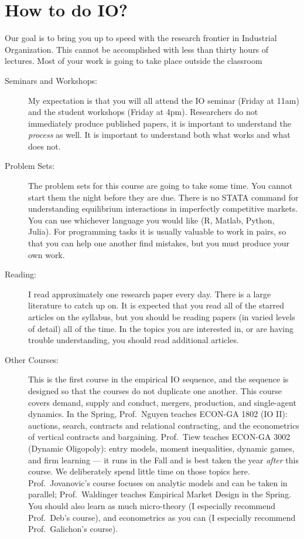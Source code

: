 \documentclass[11pt]{article}
\begin{document}
\section*{How to do IO?}
Our goal is to bring you up to speed with the research frontier in Industrial Organization. This cannot be accomplished with less than thirty hours of lectures. Most of your work is going to take place outside the classroom
\begin{description}
\item[Seminars and Workshops:] My expectation is that you will all attend the IO seminar (Friday at 11am) and the student workshops (Friday at 4pm). Researchers do not immediately produce published papers, it is important to understand the \textit{process} as well. It is important to understand both what works and what does not.
\item[Problem Sets:] The problem sets for this course are going to take some time. You cannot start them the night before they are due. There is no STATA command for understanding equilibrium interactions in imperfectly competitive markets. You can use whichever language you would like (R, Matlab, Python, Julia). For programming tasks it is usually valuable to work in pairs, so that you can help one another find mistakes, but you must produce your own work.
\item[Reading:] I read approximately one research paper every day. There is a large literature to catch up on. It is expected that you read all of the starred articles on the syllabus, but you should be reading papers (in varied levels of detail) all of the time. In the topics you are interested in, or are having trouble understanding, you should read additional articles.
\item[Other Courses:] This is the first course in the empirical IO sequence, and the sequence is designed so that the courses do not duplicate one another. This course covers demand, supply and conduct, mergers, production, and single-agent dynamics. In the Spring, Prof.\ Nguyen teaches ECON-GA 1802 (IO II): auctions, search, contracts and relational contracting, and the econometrics of vertical contracts and bargaining. Prof.\ Tiew teaches ECON-GA 3002 (Dynamic Oligopoly): entry models, moment inequalities, dynamic games, and firm learning --- it runs in the Fall and is best taken the year \emph{after} this course. We deliberately spend little time on those topics here. Prof.\ Jovanovic's course focuses on analytic models and can be taken in parallel; Prof.\ Waldinger teaches Empirical Market Design in the Spring. You should also learn as much micro-theory (I especially recommend Prof.\ Deb's course), and econometrics as you can (I especially recommend Prof.\ Galichon's course).
\end{description}
\end{document}
